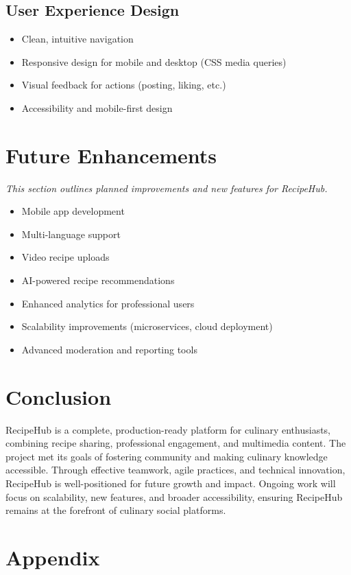 \documentclass[conference]{IEEEtran}
\begin{document}
\subsection{User Experience Design}
\begin{itemize}
    \item Clean, intuitive navigation
    \item Responsive design for mobile and desktop (CSS media queries)
    \item Visual feedback for actions (posting, liking, etc.)
    \item Accessibility and mobile-first design
\end{itemize}

\section{Future Enhancements}
\textit{This section outlines planned improvements and new features for RecipeHub.}
\begin{itemize}
    \item Mobile app development
    \item Multi-language support
    \item Video recipe uploads
    \item AI-powered recipe recommendations
    \item Enhanced analytics for professional users
    \item Scalability improvements (microservices, cloud deployment)
    \item Advanced moderation and reporting tools
\end{itemize}

\section{Conclusion}
RecipeHub is a complete, production-ready platform for culinary enthusiasts, combining recipe sharing, professional engagement, and multimedia content. The project met its goals of fostering community and making culinary knowledge accessible. Through effective teamwork, agile practices, and technical innovation, RecipeHub is well-positioned for future growth and impact. Ongoing work will focus on scalability, new features, and broader accessibility, ensuring RecipeHub remains at the forefront of culinary social platforms.

\section*{Appendix}
\end{document}
